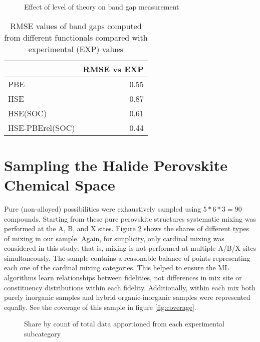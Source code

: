  
\begin{figure}[htbp]
\centering

\caption{\label{fig:expqual} Effect of level of theory on band gap measurement}
\end{figure}

 
\begin{table}[htbp]
\caption{\label{tbl:expquant} RMSE values of band gaps computed from different functionals compared with experimental (EXP) values}
\centering
\begin{tabular}{lr}
 & RMSE vs EXP\\[0pt]
\hline
PBE & 0.55\\[0pt]
HSE & 0.87\\[0pt]
HSE(SOC) & 0.61\\[0pt]
HSE-PBErel(SOC) & 0.44\\[0pt]
\end{tabular}
\end{table}

\section{Sampling the Halide Perovskite Chemical Space}
\label{sec:orgcf27dc8}
Pure (non-alloyed) possibilities were exhaustively sampled using \(5*6*3 = 90\) compounds.
Starting from these pure perovskite structures systematic mixing was performed at the A, B, and X sites.
Figure \ref{fig:lot_mix_org} shows the shares of different types of mixing in our sample.
Again, for simplicity, only cardinal mixing was considered in this study: that is, mixing is not performed at multiple A/B/X-sites simultaneously.
The sample contains a reasonable balance of points representing each one of the cardinal mixing categories.
This helped to ensure the ML algorithms learn relationships between fidelities, not differences in mix site or constituency distributions within each fidelity.
Additionally, within each mix both purely inorganic samples and hybrid organic-inorganic samples were represented equally.
See the coverage of this sample in figure \ref{fig:coverage}.

 
\begin{figure}[htbp]
\centering

\caption{\label{fig:lot_mix_org} Share by count of total data apportioned from each experimental subcategory}
\end{figure}

